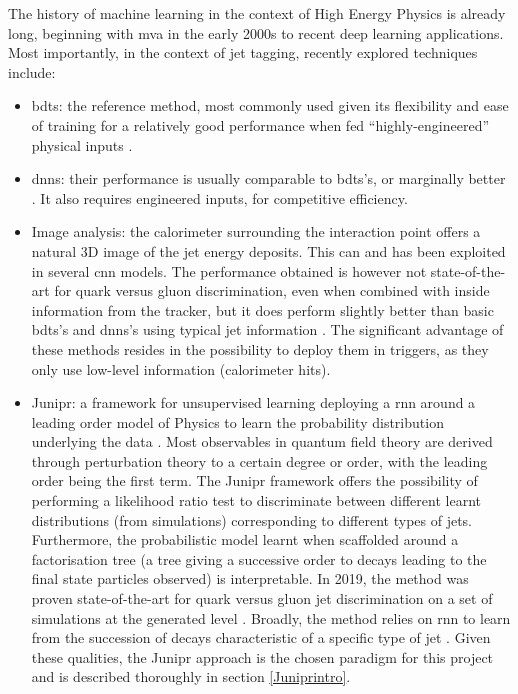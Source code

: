 The history of machine learning in the context of High Energy Physics is already long, beginning with \gls{mva} in the early 2000s \cite{Bhat:2010zz} to recent deep learning applications. Most importantly, in the context of jet tagging, recently explored techniques include:
\begin{itemize}
\item \glspl{bdt}: the reference method, most commonly used given its flexibility and ease of training for a relatively good performance when fed ``highly-engineered'' physical inputs \cite{QG_ML_vs_Detector, QG_Tagging_Charged}.
\item \glspl{dnn}: their performance is usually comparable to \glspl{bdt}'s, or marginally better \cite{Definition_QGJets}. It also requires engineered inputs, for competitive efficiency. 
\item Image analysis: the calorimeter surrounding the interaction point offers a natural 3D image of the jet energy deposits. This can and has been exploited in several \gls{cnn} models. The performance obtained is however not state-of-the-art for quark versus gluon discrimination, even when combined with inside information from the tracker, but it does perform slightly better than basic \glspl{bdt}'s and \glspl{dnn}'s using typical jet information \cite{QG_JET_Tagging_Image}. The significant advantage of these methods resides in the possibility to deploy them in triggers, as they only use low-level information (calorimeter hits). 
\item Junipr: a framework for unsupervised learning deploying a \gls{rnn} around a leading order model of Physics to learn the probability distribution underlying the data \cite{Junipr}. Most observables in quantum field theory are derived through perturbation theory to a certain degree or order, with the leading order being the first term. The Junipr framework offers the possibility of performing a likelihood ratio test to discriminate between different learnt distributions (from simulations) corresponding to different types of jets. Furthermore, the probabilistic model learnt when scaffolded around a factorisation tree (a tree giving a successive order to decays leading to the final state particles observed) is interpretable. In 2019, the method was proven state-of-the-art for quark versus gluon jet discrimination on a set of simulations at the generated level \cite{JUNIPER_Discrimination}. Broadly, the method relies on \gls{rnn} to learn from the succession of decays characteristic of a specific type of jet \cite{QG_RNN_tagging}. Given these qualities, the Junipr approach is the chosen paradigm for this project and is described thoroughly in section \ref{Juniprintro}.

\end{itemize}
